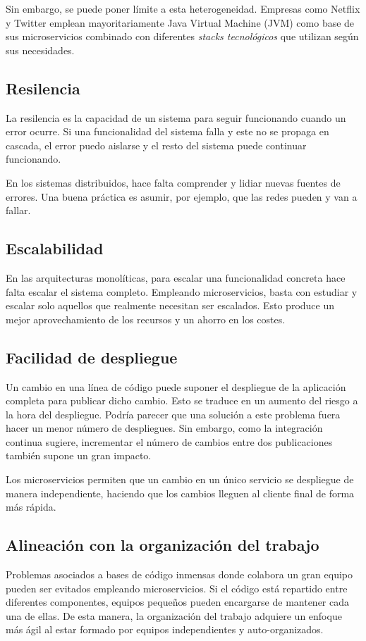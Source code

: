 \documentclass[11pt,a4paper]{article}
\begin{document}
Sin embargo, se puede poner límite a esta heterogeneidad. Empresas como Netflix y Twitter emplean mayoritariamente Java Virtual Machine (JVM) como base de sus microservicios combinado con diferentes \textit{stacks tecnológicos} que utilizan según sus necesidades.

\subsection{Resilencia}
La resilencia es la capacidad de un sistema para seguir funcionando cuando un error ocurre. Si una funcionalidad del sistema falla y este no se propaga en cascada, el error puedo aislarse y el resto del sistema puede continuar funcionando.

En los sistemas distribuidos, hace falta comprender y lidiar nuevas fuentes de errores. Una buena práctica es asumir, por ejemplo, que las redes pueden y van a fallar.

\subsection{Escalabilidad}
En las arquitecturas monolíticas, para escalar una funcionalidad concreta hace falta escalar el sistema completo. Empleando microservicios, basta con estudiar y escalar solo aquellos que realmente necesitan ser escalados. Esto produce un mejor aprovechamiento de los recursos y un ahorro en los costes.

\subsection{Facilidad de despliegue}
Un cambio en una línea de código puede suponer el despliegue de la aplicación completa para publicar dicho cambio. Esto se traduce en un aumento del riesgo a la hora del despliegue. Podría parecer que una solución a este problema fuera hacer un menor número de despliegues. Sin embargo, como la integración continua sugiere, incrementar el número de cambios entre dos publicaciones también supone un gran impacto.

Los microservicios permiten que un cambio en un único servicio se despliegue de manera independiente, haciendo que los cambios lleguen al cliente final de forma más rápida.


\subsection{Alineación con la organización del trabajo}
Problemas asociados a bases de código inmensas donde colabora un gran equipo pueden ser evitados empleando microservicios. Si el código está repartido entre diferentes componentes, equipos pequeños pueden encargarse de mantener cada una de ellas. De esta manera, la organización del trabajo adquiere un enfoque más ágil al estar formado por equipos independientes y auto-organizados.
\end{document}
